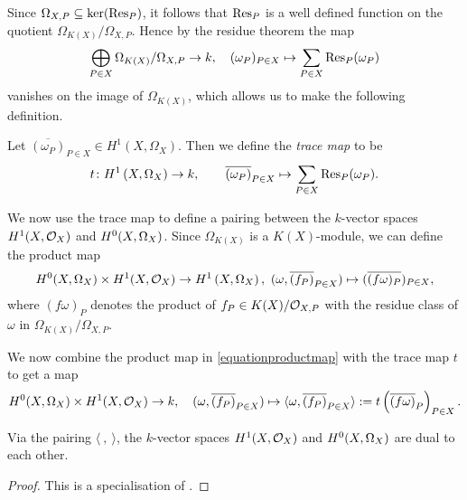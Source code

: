 \begin{cor}
Since $\Omega_{X,P} \subseteq \ker (\operatorname{Res}_P)$, it follows that $\operatorname{Res}_P$ is a well defined function on the quotient $\Omega_{K(X)}/\Omega_{X,P}$.
Hence by the residue theorem the map
    \begin{equation*} 
    \bigoplus_{P \in X} \Omega_{K(X)}/\Omega_{X,P} \rightarrow k, \quad (\omega_P)_{P \in X} \mapsto \sum_{P\in X} \operatorname{Res}_P(\omega_P)
    \end{equation*} 
vanishes on the image of $\Omega_{K(X)}$, which allows us to make the following definition.
    
    \begin{defn}
    Let $\overline{(\omega_P)}_{P \in X} \in H^1(X,\Omega_X)$.
    Then we define the \emph{trace map} to be 
        \[
    t \colon H^1\left(X, \Omega_X\right) \rightarrow k, \qquad \overline{(\omega_P)}_{P \in X}  \mapsto \sum_{P \in X} \operatorname{Res}_P(\omega_P).
        \]
    \end{defn}

We now use the trace map to define a pairing between the $k$-vector spaces $H^1(X,\mathcal{O}_X)$ and ${H^0(X,\Omega_X)}$.
Since $\Omega_{K(X)}$ is a $K(X)$-module, we can define the product map 
    \begin{equation}\label{equationproductmap}
    {H^0(X,\Omega_X)} \times H^1(X,\mathcal{O}_X) \rightarrow H^1\left(X, \Omega_X\right), \ (\omega, \overline{(f_P)}_{P \in X}) \mapsto ( \overline {(f  \omega)_P})_{P \in X},
    \end{equation}
where $(f\omega)_P$ denotes the product of $f_P \in K(X)/{\cal O}_{X,P}$ with the residue class of $\omega$ in $\Omega_{K(X)}/\Omega_{X,P}$.

We now combine the product map in \eqref{equationproductmap} with the trace map $t$ to get a map 
    \[
    {H^0(X,\Omega_X)} \times H^1(X,\mathcal{O}_X) \rightarrow k,\quad (\omega, \overline{(f_P)}_{P \in X}) \mapsto \langle \omega, \overline{(f_P)}_{P \in X} \rangle := t \left( \overline{(f \omega)}_P \right)_{P \in X}.
    \]

    \begin{thm}\label{theoremserreduality}
    Via the pairing $\langle\ ,\ \rangle$, the $k$-vector spaces $H^1(X,\mathcal{O}_X)$ and ${H^0(X,\Omega_X)}$ are dual to each other.
    \end{thm}
    \begin{proof}
    This is a specialisation of \cite[Chap.\ II, Thm.\ 2]{algebraicgroupsandclassfields}.
    \end{proof}


\end{cor}

